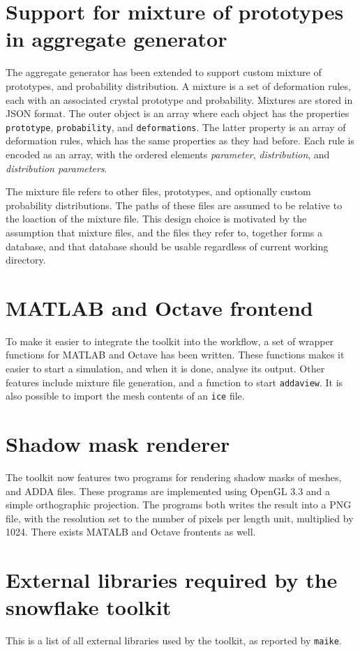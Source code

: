 \documentclass[a4paper,10pt]{scrartcl}
\newcommand{\prgname}[1]{\texttt{#1}}
\begin{document}
\section{Support for mixture of prototypes in aggregate generator}
The aggregate generator has been extended to support custom mixture of prototypes, and probability distribution. A mixture is a set of deformation rules, each with an associated crystal prototype and probability. Mixtures are stored in JSON format. The outer object is an array where each object has the properties \texttt{prototype}, \texttt{probability}, and \texttt{deformations}. The latter property is an array of deformation rules, which has the same properties as they had before. Each rule is encoded as an array, with the ordered elements \textit{parameter}, \textit{distribution}, and \textit{distribution parameters}.

The mixture file refers to other files, prototypes, and optionally custom probability distributions. The paths of these files are assumed to be relative to the loaction of the mixture file. This design choice is motivated by the assumption that mixture files, and the files they refer to, together forms a database, and that database should be usable regardless of current working directory.

\section{MATLAB and Octave frontend}
To make it easier to integrate the toolkit into the workflow, a set of wrapper functions for MATLAB and Octave has been written. These functions makes it easier to start a simulation, and when it is done, analyse its output. Other features include mixture file generation, and a function to start \texttt{addaview}. It is also possible to import the mesh contents of an \texttt{ice} file.

\section{Shadow mask renderer}
The toolkit now features two programs for rendering shadow masks of meshes, and ADDA files. These programs are implemented using OpenGL 3.3 and a simple orthographic projection. The programs both writes the result into a PNG file, with the resolution set to the number of pixels per length unit, multiplied by 1024. There exists MATALB and Octave frontents as well.

\section{External libraries required by the snowflake toolkit}
This is a list of all external libraries used by the toolkit, as reported by \prgname{maike}.
\end{document}
